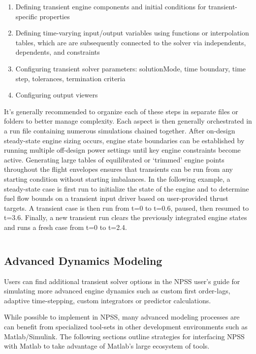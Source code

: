 \documentclass[heading.tex]{subfiles}
\begin{document}
\begin{enumerate}
\item Defining transient engine components and initial conditions for transient-specific properties
\item Defining time-varying input/output variables using functions or interpolation tables,
which are are subsequently connected to the solver via independents, dependents, and constraints
\item Configuring transient solver parameters: solutionMode, time boundary, time step, tolerances, termination criteria
\item Configuring output viewers
\end{enumerate}

It's generally recommended to organize each of these steps in separate files or folders to better manage complexity.
Each aspect is then generally orchestrated in a run file containing numerous simulations chained together. 
After on-design steady-state engine sizing occurs, engine state boundaries can be established by running multiple
off-design power settings until key engine constraints become active.
Generating large tables of equilibrated or `trimmed' engine points
throughout the flight envelopes ensures that transients can be run from any starting condition without
starting imbalances.
In the following example, a steady-state case is first run to initialize the state of the engine and
to determine fuel flow bounds on a transient input driver based on user-provided thrust targets.
A transient case is then run from t=0 to t=0.6, paused, then resumed to t=3.6.
Finally, a new transient run clears the previously integrated engine states and runs a fresh case from t=0 to t=2.4.

 \begin{adjustwidth}{1cm}{-1cm}
 \inputminted[]{c++}{code/transientRun}
 \end{adjustwidth} 

\subsection{Advanced Dynamics Modeling}

Users can find additional transient solver options in the NPSS user's guide \cite[chap.~18]{NPSS} for simulating
more advanced engine dynamics such as custom first order-lags, adaptive time-stepping, custom integrators or
predictor calculations.

While possible to implement in NPSS, many advanced modeling processes are can benefit
from specialized tool-sets in other development environments such as Matlab/Simulink.
The following sections outline strategies for interfacing NPSS with Matlab to take advantage of Matlab's large
ecosystem of tools.
\end{document}
